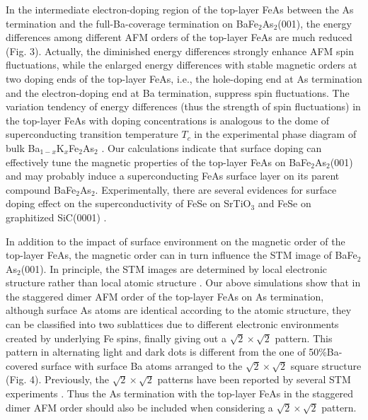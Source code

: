 \documentclass[twocolumn,aps,showpacs,prb]{revtex4-1}
\begin{document}
In the intermediate electron-doping region of the top-layer FeAs between the As termination and the full-Ba-coverage termination on BaFe$_{2}$As$_{2}$(001), the energy differences among different AFM orders of the top-layer FeAs are much reduced (Fig. 3). %
Actually, the diminished energy differences strongly enhance AFM spin fluctuations, while the enlarged energy differences with stable magnetic orders at two doping ends of the top-layer FeAs, i.e., the hole-doping end at As termination and the electron-doping end at Ba termination, suppress spin fluctuations. The variation tendency of energy differences (thus the strength of spin fluctuations) in the top-layer FeAs with doping concentrations is analogous to the dome of superconducting transition temperature $T_{c}$ in the experimental phase diagram of bulk Ba$_{1-x}$K$_x$Fe$_{2}$As$_{2}$ \cite{5HChen(2009)EPL}.
Our calculations indicate that surface doping can effectively tune the magnetic properties of the top-layer FeAs on BaFe$_2$As$_2$(001) and may probably induce a superconducting FeAs surface layer on its parent compound BaFe$_2$As$_2$. Experimentally, there are several evidences for surface doping effect on the superconductivity of FeSe on SrTiO$_3$ \cite{XueQK2012,ZhouXJ2012,FengDL2013,ZhouXJ2013,DingH2017,GuoJD2017} and FeSe on graphitized SiC(0001) \cite{SongCL2016}.

In addition to the impact of surface environment on the magnetic order of the top-layer FeAs, the magnetic order can in turn influence the STM image of BaFe$_{2}$As$_{2}$(001). In principle, the STM images are determined by local electronic structure rather than local atomic structure \cite{Binnig82APL,Binnig82PRL,Tersoff83}. Our above simulations show that in the staggered dimer AFM order of the top-layer FeAs on As termination, although surface As atoms are identical according to the atomic structure, they can be classified into two sublattices due to different electronic environments created by underlying Fe spins, finally giving out a $\sqrt{2}\times\sqrt{2}$ pattern. This pattern in alternating light and dark dots is different from the one of 50\%Ba-covered surface with surface Ba atoms arranged to the $\sqrt{2}\times\sqrt{2}$ square structure (Fig. 4). Previously, the $\sqrt{2}\times\sqrt{2}$ patterns have been reported by several STM experiments \cite{13MasseeF(2009)PRB,15NascimentoVB(2009)PRL,25HuiZhang(2010)PRB,Li2012PRB}. Thus the As termination with the top-layer FeAs in the staggered dimer AFM order should also be included when considering a $\sqrt{2}\times\sqrt{2}$ pattern.
\end{document}
